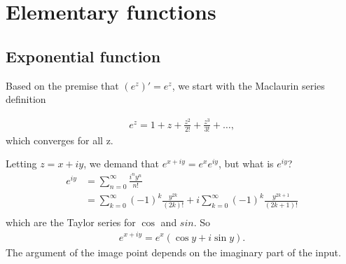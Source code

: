 \documentclass[12pt]{article}
\begin{document}
\section{Elementary functions}

\subsection*{Exponential function}

Based on the premise that $(e^z)' = e^z$, we start with the Maclaurin series definition

\begin{align*}
  e^z = 1 + z + \frac{z^2}{2!} + \frac{z^3}{3!} + \ldots,
\end{align*}
which converges for all z.

Letting $z = x + iy$, we demand that $e^{x + iy} = e^xe^{iy}$, but what is $e^{iy}$?
\begin{align*}
  e^{iy}
  &= \sum_{n=0}^\infty \frac{i^ny^n}{n!} \\
  &= \sum_{k=0}^\infty (-1)^{k}\frac{y^{2k}}{(2k)!} +
     i\sum_{k=0}^\infty (-1)^{k}\frac{y^{2k + 1}}{(2k + 1)!}\\
\end{align*}
which are the Taylor series for $\cos$ and $sin$. So
\begin{align*}
  e^{x + iy} = e^x(\cos y + i\sin y).
\end{align*}
The argument of the image point depends on the imaginary part of the input.


\end{document}
